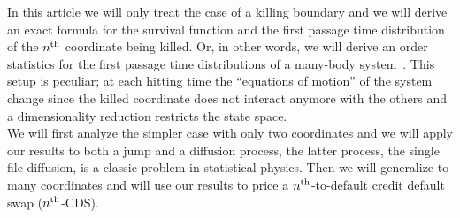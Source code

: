 \documentclass[a4paper,11pt]{amsart}
\theoremstyle{remark}
\newcommand{\nth}{n\textsuperscript{th}}
\begin{document}
In this article we will only treat the case of a killing boundary and we will derive an exact formula for the survival function and the first passage time distribution of the $\nth$ coordinate being killed. Or, in other words, we will derive an order statistics for the first passage time distributions of a many-body system~\cite{majumdar_extreme_2020}. This setup is peculiar; at each hitting time the ``equations of motion'' of the system change since the killed coordinate does not interact anymore with the others and a dimensionality reduction restricts the state space.\\ 
We will first analyze the simpler case with only two coordinates and we will apply our results to both a jump and a diffusion process, the latter process, the single file diffusion, is a classic problem in statistical physics. Then we will generalize to many coordinates and will use our results to price a $\nth$-to-default credit default swap ($\nth$-CDS).
\end{document}
